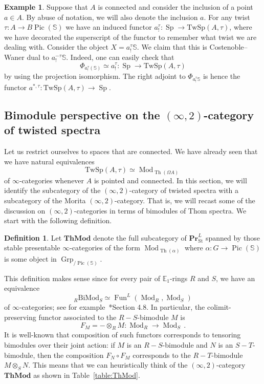 \documentclass[10pt]{amsart}
\newcommand{\longto}{\longrightarrow}
\theoremstyle{plain}
\theoremstyle{definition}
\newtheorem{definition}[theorem]{Definition}
\newtheorem{example}[theorem]{Example}
\DeclareMathOperator{\Mod}{Mod}
\DeclareMathOperator{\Grp}{Grp}
\DeclareMathOperator{\Sp}{Sp}
\DeclareMathOperator{\Fun}{Fun}
\DeclareMathOperator{\Th}{Th}
\DeclareMathOperator{\Pic}{Pic}
\newcommand{\St}{\mathrm{St}}
\newcommand{\bE}{\mathbb{E}}
\newcommand{\bS}{\mathbb{S}}
\newcommand{\TwSp}{\mathrm{TwSp}}
\begin{document}
\begin{example}
  Suppose that $A$ is connected and consider the inclusion of a point $a \in A$. By abuse of notation, we will also denote the inclusion $a$. For any twist $\tau : A \to B\Pic(\bS)$ we have an induced functor $a^{\tau}_! : \Sp \longto \TwSp(A,\tau)$, where we have decorated the superscript of the functor to remember what twist we are dealing with. Consider the object $X = a^{\tau}_! \bS$. We claim that this is Costenoble--Waner dual to $a_!^{-\tau} \bS$. Indeed, one can easily check that
  \[
  \Phi_{a^{\tau}_!(\bS)} \simeq a^{\tau}_! : \Sp \longto \TwSp(A,\tau)
  \]
  by using the projection isomorphism. The right adjoint to $\Phi_{a^{\tau}_! \bS}$ is hence the functor $a^{*,\tau} : \TwSp(A,\tau) \to \Sp$.
\end{example}

\subsection{Bimodule perspective on the $(\infty,2)$-category of twisted spectra}

Let us restrict ourselves to spaces that are connected. We have already seen that we have natural equivalences
\[
\TwSp(A,\tau) \simeq \Mod_{\Th(\Omega A)}
\]
of $\infty$-categories whenever $A$ is pointed and connected.
In this section, we will identify the subcategory of the $(\infty,2)$-category of twisted spectra with a subcategory of the Morita $(\infty,2)$-category.
That is, we will recast some of the discussion on $(\infty,2)$-categories in terms of bimodules of Thom spectra.
We start with the following definition.

\begin{definition}
  Let $\mathbf{ThMod}$ denote the full subcategory of $\mathbf{Pr}^L_{\St}$ spanned by those stable presentable $\infty$-categories of the form $\Mod_{\Th(\alpha)}$ where $\alpha : G \to \Pic(\bS)$ is some object in $\Grp_{/\Pic(\bS)}$.
\end{definition}

This definition makes sense since for every pair of $\bE_1$-rings $R$ and $S$, we have an equivalence
\[
{}_{R} \mathrm{BiMod}_{S} \simeq \Fun^L(\Mod_R , \Mod_S)
\]
of $\infty$-categories; see for example~\cite{HA}*{Section 4.8}. In particular, the colimit-preserving functor associated to the $R-S$-bimodule $M$ is
\[
F_M = - \otimes_R M : \Mod_R \longto \Mod_S \,.
\]
It is well-known that composition of such functors corresponds to tensoring bimodules over their joint action: if $M$ is an $R-S$-bimodule and $N$ is an $S-T$-bimodule, then the composition $F_N \circ F_M$ corresponds to the $R-T$-bimodule $M \otimes_S N$.
This means that we can heuristically think of the $(\infty,2)$-category $\mathbf{ThMod}$  as shown in Table~\ref{table:ThMod}.
\end{document}
